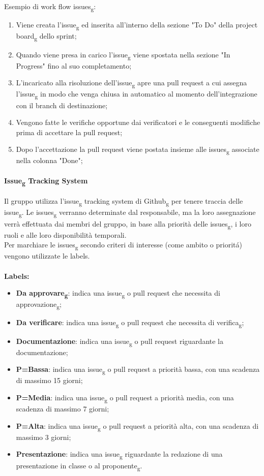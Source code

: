 \\\\
Esempio di work flow issues\textsubscript{g}:
\begin{enumerate}
	\item Viene creata l'issue\textsubscript{g} ed inserita all'interno della sezione "To Do" della project board\textsubscript{g} dello sprint;
	\item Quando viene presa in carico l'issue\textsubscript{g} viene spostata nella sezione "In Progress" fino al suo completamento;
	\item L'incaricato alla risoluzione dell'issue\textsubscript{g} apre una pull request a cui assegna l'issue\textsubscript{g} in modo che  venga chiusa in automatico al momento dell'integrazione con il branch di destinazione;
	\item Vengono fatte le verifiche opportune dai verificatori e le conseguenti modifiche prima di accettare la pull request;
	\item Dopo l'accettazione la pull request viene postata insieme alle issues\textsubscript{g} associate nella colonna "Done";
\end{enumerate}
\paragraph{Issue\textsubscript{g} Tracking System}
Il gruppo utilizza l'issue\textsubscript{g} tracking system di Github\textsubscript{g} per tenere traccia delle issue\textsubscript{g}. 
Le issues\textsubscript{g} verranno determinate dal responsabile, ma la loro assegnazione verrà effettuata dai membri del gruppo, in base alla priorità delle issues\textsubscript{g}, i loro ruoli e alle loro disponibilità temporali.\\
Per marchiare le issues\textsubscript{g} secondo criteri di interesse (come ambito o prioritá) vengono utilizzate le labels.
\\\\\textbf{Labels:}
\begin{itemize}
	\item \textbf{Da approvare\textsubscript{g}}: indica una issue\textsubscript{g} o pull request che necessita di approvazione\textsubscript{g};
	\item \textbf{Da verificare}: indica una issue\textsubscript{g} o pull request che necessita di verifica\textsubscript{g};
	\item \textbf{Documentazione}: indica una issue\textsubscript{g} o pull request riguardante la documentazione;
	\item \textbf{P=Bassa}: indica una issue\textsubscript{g} o pull request a priorità bassa, con una scadenza di massimo 15 giorni;
	\item \textbf{P=Media}: indica una issue\textsubscript{g} o pull request a priorità media, con una scadenza di massimo 7 giorni;
	\item \textbf{P=Alta}: indica una issue\textsubscript{g} o pull request a priorità alta, con una scadenza di massimo 3 giorni;
	\item \textbf{Presentazione}: indica una issue\textsubscript{g} riguardante la redazione di una presentazione in classe o al proponente\textsubscript{g}.
\end{itemize}

